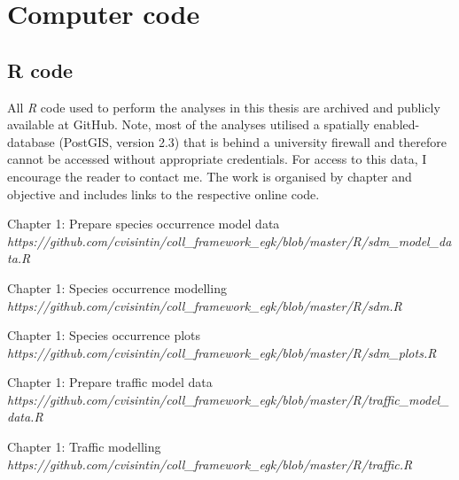 \chapter{Computer code}\label{apx:A}
\newpage

\section{R code}

All \textit{R} code used to perform the analyses in this thesis are archived and publicly available at GitHub. Note, most of the analyses utilised a spatially enabled-database (PostGIS, version 2.3) that is behind a university firewall and therefore cannot be accessed without appropriate credentials. For access to this data, I encourage the reader to contact me. The work is organised by chapter and objective and includes links to the respective online code.

\vspace{.5cm}
\noindent Chapter 1: Prepare species occurrence model data\\
\textit{https://github.com/cvisintin/coll\_framework\_egk/blob/master/R/sdm\_model\_data.R}
%

\vspace{.5cm}
\noindent Chapter 1: Species occurrence modelling\\
\textit{https://github.com/cvisintin/coll\_framework\_egk/blob/master/R/sdm.R}
%

\vspace{.5cm}
\noindent Chapter 1: Species occurrence plots\\
\textit{https://github.com/cvisintin/coll\_framework\_egk/blob/master/R/sdm\_plots.R}
%

\vspace{.5cm}
\noindent Chapter 1: Prepare traffic model data\\
\textit{https://github.com/cvisintin/coll\_framework\_egk/blob/master/R/traffic\_model\_data.R}
%

\vspace{.5cm}
\noindent Chapter 1: Traffic modelling\\
\textit{https://github.com/cvisintin/coll\_framework\_egk/blob/master/R/traffic.R}
%

